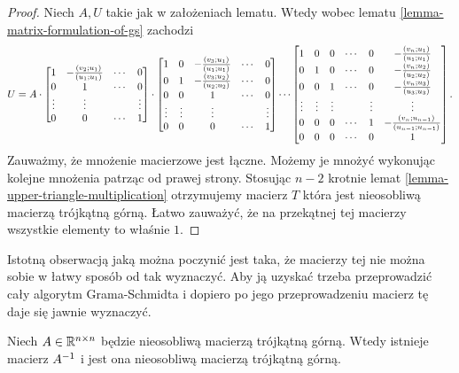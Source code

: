 \documentclass[10pt,a4paper]{report}
\newcommand{\mx}[1]{{#1}}
\newcommand{\proj}[2]{\frac{\scalar{#2}{#1}}{\scalar{#1}{#1}}}
\begin{document}
\begin{proof}
Niech $\mx{A}, \mx{U}$ takie jak w założeniach lematu. Wtedy wobec lematu \ref{lemma-matrix-formulation-of-gs} zachodzi 
$$
U = A \cdot 
\begin{bmatrix}
1 & -\proj{u_1}{v_2} & \cdots & 0 \\
0 & 1 & \cdots & 0 \\
\vdots & \vdots & & \vdots \\
0 & 0 & \cdots & 1
\end{bmatrix} \cdot
\begin{bmatrix}
1 & 0 & -\proj{u_1}{v_3} &\cdots & 0 \\
0 & 1 & -\proj{u_2}{v_3} &\cdots & 0 \\
0 & 0 & 1 & \cdots & 0 \\
\vdots & \vdots & \vdots &  & \vdots \\
0 & 0 & 0 & \cdots & 1
\end{bmatrix}
 \cdots
\begin{bmatrix}
1 & 0 & 0 & \cdots & 0 & -\proj{u_1}{v_n} \\
0 & 1 & 0 & \cdots & 0 &-\proj{u_2}{v_n} \\
0 & 0 & 1 & \cdots & 0 & -\proj{u_3}{v_n} \\
\vdots & \vdots & \vdots &  & \vdots & \vdots \\
0 & 0 & 0 & \cdots & 1 & -\proj{u_{n-1}}{v_n} \\
0 & 0 & 0 & \cdots & 0 & 1
\end{bmatrix}.
$$ 
Zauważmy, że mnożenie macierzowe jest łączne. Możemy je mnożyć wykonując kolejne mnożenia patrząc od prawej strony. Stosując $n-2$ krotnie lemat \ref{lemma-upper-triangle-multiplication} otrzymujemy macierz $\mx{T}$ która jest nieosobliwą macierzą trójkątną górną. Łatwo zauważyć, że na przekątnej tej macierzy wszystkie elementy to właśnie $1$. 
\end{proof}

Istotną obserwacją jaką można poczynić jest taka, że macierzy tej nie można sobie w łatwy sposób od tak wyznaczyć. Aby ją uzyskać trzeba przeprowadzić cały algorytm Grama-Schmidta i dopiero po jego przeprowadzeniu macierz tę daje się jawnie wyznaczyć.

\begin{lemma}\label{lemma-upper-triangle-invertion}
Niech $\mx{A} \in \setR^{n \times n}$ będzie nieosobliwą macierzą trójkątną górną. Wtedy istnieje macierz $\inverse{\mx{A}}$ i jest ona nieosobliwą macierzą trójkątną górną.
\end{lemma}
\end{document}
